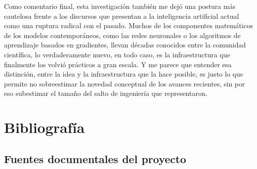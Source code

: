 \documentclass[12pt,letterpaper]{article}
\begin{document}
Como comentario final, esta investigaci\'on tambi\'en me dej\'o una postura m\'as cautelosa frente a los discursos que presentan a la inteligencia artificial actual como una ruptura radical con el pasado. Muchos de los componentes matem\'aticos de los modelos contempor\'aneos, como las redes neuronales o los algoritmos de aprendizaje basados en gradientes, llevan d\'ecadas conocidos entre la comunidad cient\'ifica, lo verdaderamente nuevo, en todo caso, es la infraestructura que finalmente los volvi\'o pr\'acticos a gran escala. Y me parece que entender esa distinci\'on, entre la idea y la infraestructura que la hace posible, es justo lo que permite no sobreestimar la novedad conceptual de los avances recientes, sin por eso subestimar el tama\~no del salto de ingenier\'ia que representaron.

\section*{Bibliograf\'ia}

\subsection*{Fuentes documentales del proyecto}
\end{document}
